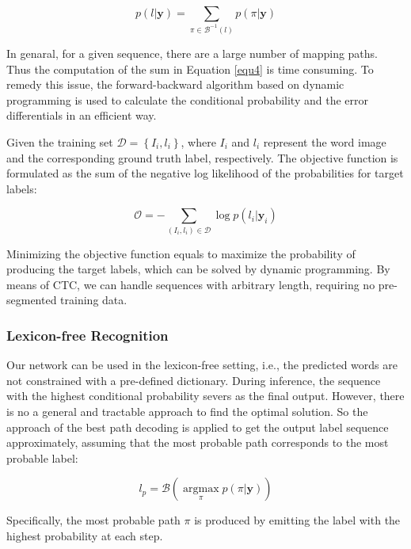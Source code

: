 \documentclass[letterpaper]{article} %
\begin{document}
\begin{equation}
p( l |\textbf{y}) = \sum_{\pi \in \mathcal{B}^{-1}(l)}p(\pi | \textbf{y})
\label{equ4}
\end{equation}

In genaral, for a given sequence, there are a large number of mapping paths. Thus the computation of the sum in Equation \ref{equ4} is time consuming. To remedy this issue, the forward-backward algorithm based on dynamic programming is used to calculate the conditional probability and the error differentials in an efficient way.\par
Given the training set $\mathcal{D}=\left\{I_{i},l_{i} \right\}$, where $I_{i}$ and $l_{i}$ represent the word image and the corresponding ground truth label, respectively. The objective function is formulated as the sum of the negative log likelihood of the probabilities for target labels:

\begin{equation}
\mathcal{O} = - \sum_{(I_{i},l_{i}) \in \mathcal{D}} \log p(l_{i}|\textbf{y}_{i})
\end{equation}

Minimizing the objective function equals to maximize the probability of producing the target labels, which can be solved by dynamic programming. By means of CTC, we can handle sequences with arbitrary length, requiring no pre-segmented training data.

\subsubsection{Lexicon-free Recognition}

Our network can be used in the lexicon-free setting, i.e., the predicted words are not constrained with a pre-defined dictionary. During inference, the sequence with the highest conditional probability severs as the final output. However, there is no a general and tractable approach to find the optimal solution. So the approach of the best path decoding \cite{graves2006connectionist} is applied to get the output label sequence approximately, assuming that the most probable path corresponds to the most probable label:

\begin{equation}
l_{p}=\mathcal{B}(\mathop{argmax} \limits_{\pi}p(\pi|\textbf{y}))
\end{equation}

Specifically, the most probable path $\pi$ is produced by emitting the label with the highest probability at each step.
\end{document}

